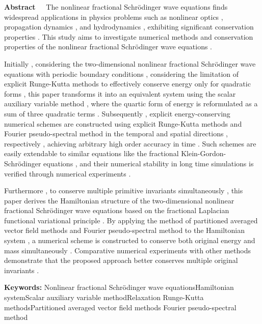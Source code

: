 \begin{EnglishAbstract}
\item {\bf Abstract\ \ } 
The nonlinear fractional Schr{\"o}dinger wave equations finds widespread applications in physics problems such as nonlinear optics , propagation dynamics , and hydrodynamics , exhibiting significant conservation properties . 
This study aims to investigate numerical methods and conservation properties of the nonlinear fractional Schr{\"o}dinger wave equations . 

Initially , considering the two-dimensional nonlinear fractional Schr{\"o}dinger wave equations with periodic boundary conditions , considering the limitation of explicit Runge-Kutta methods to effectively conserve energy only for quadratic forms , this paper transforms it into an equivalent system using the scalar auxiliary variable method , where the quartic form of energy is reformulated as a sum of three quadratic terms . 
Subsequently , explicit energy-conserving numerical schemes are constructed using explicit Runge-Kutta methods and Fourier pseudo-spectral method in the temporal and spatial directions , respectively , achieving arbitrary high order accuracy in time . 
Such schemes are easily extendable to similar equations like the fractional Klein-Gordon-Schr{\"o}dinger equations , and their numerical stability in long time simulations is verified through numerical experiments . 

Furthermore , to conserve multiple primitive invariants simultaneously , this paper derives the Hamiltonian structure of the two-dimensional nonlinear fractional Schr{\"o}dinger wave equations based on the fractional Laplacian functional variational principle . 
By applying the method of partitioned averaged vector field methods and Fourier pseudo-spectral method to the Hamiltonian system , a numerical scheme is constructed to conserve both original energy and mass simultaneously . 
Comparative numerical experiments with other methods demonstrate that the proposed approach better conserves multiple original invariants . 


\item {\bf Keywords:} Nonlinear fractional Schr{\"o}dinger wave equations\qquad Hamiltonian system\qquad Scalar auxiliary variable method\qquad Relaxation Runge-Kutta methods\qquad Partitioned averaged vector field methods \qquad Fourier pseudo-spectral method
\end{EnglishAbstract}